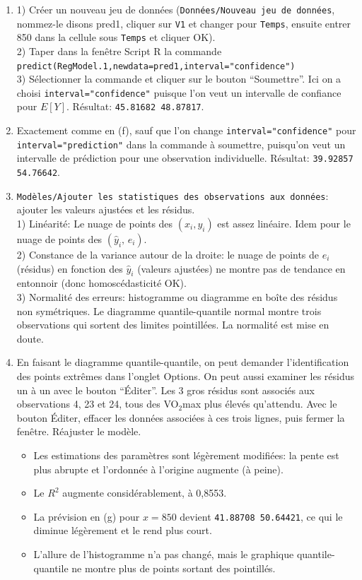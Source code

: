 \documentclass[12pt]{article}
\begin{document}
{\begin{enumerate}
\begin{enumerate}
    \item[(f)] 1) Créer un nouveau jeu de données ({\tt Données/Nouveau jeu de données}, nommez-le disons pred1, cliquer sur {\tt V1} et changer pour {\tt Temps}, ensuite entrer 850 dans la cellule sous {\tt Temps} et cliquer OK).\\
        2) Taper dans la fenêtre Script R la commande {\tt predict(RegModel.1,newdata=pred1,interval="confidence")}\\
        3) Sélectionner la commande et cliquer sur le bouton ``Soumettre''. Ici on a choisi {\tt interval="confidence"} puisque l'on veut un intervalle de confiance pour $E[Y]$.  Résultat: {\tt 45.81682 48.87817}.
    \item[(g)] Exactement comme en (f), sauf que l'on change {\tt interval="confidence"} pour {\tt interval="prediction"} dans la commande à soumettre, puisqu'on veut un intervalle de prédiction pour une observation individuelle. Résultat: {\tt 39.92857 54.76642}.
    \item[(h)] {\tt Modèles/Ajouter les statistiques des observations aux données}:  ajouter les valeurs ajustées et les résidus.\\
        1) Linéarité: Le nuage de points des $(x_i,y_i)$ est assez linéaire. Idem pour le nuage de points des $(\hat y_i,\, e_i)$.\\
        2) Constance de la variance autour de la droite:  le nuage de points de $e_i$ (résidus) en fonction des $\hat{y}_i$ (valeurs ajustées) ne montre pas de tendance en entonnoir (donc homoscédasticité OK). \\
        3) Normalité des erreurs:  histogramme ou diagramme en boîte des résidus non symétriques. Le diagramme quantile-quantile normal montre trois observations qui sortent des limites pointillées.  La normalité est mise en doute.
    \item[(i)] En faisant le diagramme quantile-quantile, on peut demander l'identification des points extrêmes dans l'onglet Options. On peut aussi examiner les résidus un à un avec le bouton ``Éditer''. Les 3 gros résidus sont associés aux observations 4, 23 et 24, tous des VO$_2$max plus élevés qu'attendu.    Avec le bouton Éditer,  effacer les données associées à ces trois lignes, puis fermer la fenêtre. Réajuster le modèle. \\
        \begin{itemize}
        \item Les estimations des paramètres sont légèrement modifiées: la pente est plus abrupte et l'ordonnée à l'origine augmente (à peine).
        \item Le $R^2$ augmente considérablement, à 0,8553.
        \item La prévision en (g) pour $x=850$ devient   {\tt 41.88708 50.64421}, ce qui le diminue légèrement et le rend plus court.
        \item L'allure de l'histogramme n'a pas changé, mais le graphique quantile-quantile ne montre plus de points sortant des pointillés.
        \end{itemize}
    \end{enumerate}
     

\end{enumerate}}
\end{document}
